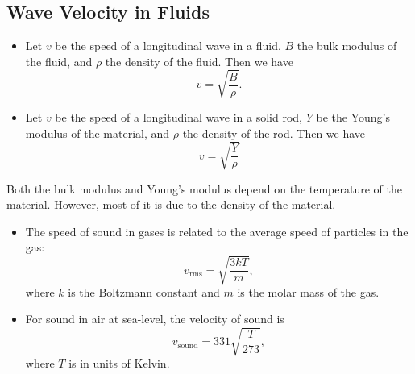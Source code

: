 \documentclass[class=article, crop=false]{standalone}
\begin{document}
  \subsection{Wave Velocity in Fluids}
  \begin{itemize}
    \item Let $v$ be the speed of a longitudinal wave in a fluid, $B$ the bulk modulus of the fluid, and $\rho$ the density of the fluid. Then we have
    \[
      v = \sqrt{\frac{B}{\rho}}. 
    \]
    \item Let $v$ be the speed of a longitudinal wave in a solid rod, $Y$ be the Young's modulus of the material, and $\rho$ the density of the rod. Then we have
    \[
      v=\sqrt{\frac{Y}{\rho}}
    \]
  \end{itemize}
  \begin{note}{}
    Both the bulk modulus and Young's modulus depend on the temperature of the material. However, most of it is due to the density of the material.
  \end{note}
  \begin{itemize}
    \item The speed of sound in gases is related to the average speed of particles in the gas:
    \[
      v_{\text{rms}} = \sqrt{\frac{3kT}{m}},
    \]
    where $k$ is the Boltzmann constant and $m$ is the molar mass of the gas.
    \item For sound in air at sea-level, the velocity of sound is
    \[
      v_{\text{sound}} = 331 \sqrt{\frac{T}{273}},
    \]
    where $T$ is in units of Kelvin.
  \end{itemize}
\end{document}
